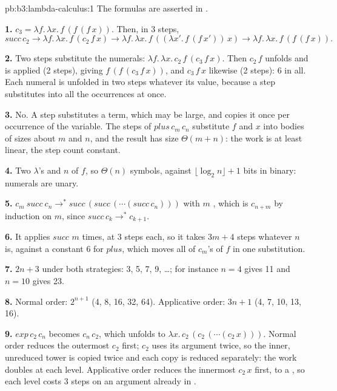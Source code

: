 \begin{solution}{pb:b3:lambda-calculus:1}
The formulas are asserted in .

\textbf{1.} $c_3 = \lambda f.\,\lambda x.\,f\,(f\,(f\,x))$. Then, in 3 steps,
\[ \mathit{succ}\,c_2 \to \lambda f.\,\lambda x.\,f\,(c_2\,f\,x) \to \lambda f.\,\lambda x.\,f\,((\lambda x'.\,f\,(f\,x'))\,x) \to \lambda f.\,\lambda x.\,f\,(f\,(f\,x)). \]

\textbf{2.} Two steps substitute the numerals: $\lambda f.\,\lambda x.\,c_2\,f\,(c_3\,f\,x)$. Then $c_2\,f$ unfolds and is applied (2 steps), giving $f\,(f\,(c_3\,f\,x))$, and $c_3\,f\,x$ likewise (2 steps): 6 in all. Each numeral is unfolded in two steps whatever its value, because a step substitutes into all the occurrences at once.

\textbf{3.} No. A step substitutes a term, which may be large, and copies it once per occurrence of the variable. The steps of $\mathit{plus}\,c_m\,c_n$ substitute $f$ and $x$ into bodies of sizes about $m$ and $n$, and the result has size $\Theta(m + n)$: the work is at least linear, the step count constant.

\textbf{4.} Two $\lambda$'s and $n$  of $f$, so $\Theta(n)$ symbols, against $\lfloor \log_2 n \rfloor + 1$ bits in binary: numerals are unary.

\textbf{5.} $c_m\ \mathit{succ}\ c_n \to^* \mathit{succ}\,(\mathit{succ}\,(\cdots(\mathit{succ}\,c_n)))$ with $m$ , which is $c_{n+m}$ by induction on $m$, since $\mathit{succ}\,c_k \to^* c_{k+1}$.

\textbf{6.} It applies $\mathit{succ}$ $m$ times, at 3 steps each, so it takes $3m + 4$ steps whatever $n$ is, against a constant 6 for $\mathit{plus}$, which moves all of $c_m$'s  of $f$ in one substitution.

\textbf{7.} $2n + 3$ under both strategies: 3, 5, 7, 9, \dots; for instance $n = 4$ gives 11 and $n = 10$ gives 23.

\textbf{8.} Normal order: $2^{n+1}$ (4, 8, 16, 32, 64). Applicative order: $3n + 1$ (4, 7, 10, 13, 16).

\textbf{9.} $\mathit{exp}\,c_2\,c_n$ becomes $c_n\,c_2$, which unfolds to $\lambda x.\,c_2\,(c_2\,(\cdots(c_2\,x)))$. Normal order reduces the outermost $c_2$ first; $c_2$ uses its argument twice, so the inner, unreduced tower is copied twice and each copy is reduced separately: the work doubles at each level. Applicative order reduces the innermost $c_2\,x$ first, to a , so each level costs 3 steps on an argument already in .


\end{solution}
